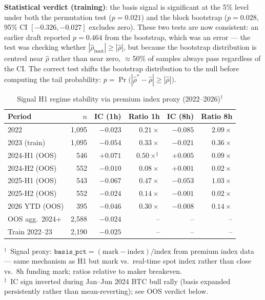 \documentclass[12pt, a4paper]{article}
\theoremstyle{definition}
\begin{document}
\textbf{Statistical verdict (training)}: the basis signal is significant at the 5\%
level under both the permutation test ($p = 0.021$) and the block bootstrap
($p = 0.028$, 95\% CI $[-0.326, -0.027]$ excludes zero). These two tests are
now consistent: an earlier draft reported $p = 0.464$ from the bootstrap, which
was an error — the test was checking whether $|\hat{\rho}_{\text{boot}}| \geq |\hat{\rho}|$,
but because the bootstrap distribution is centred near $\hat{\rho}$ rather than
near zero, $\approx$50\% of samples always pass regardless of the CI. The correct
test shifts the bootstrap distribution to the null before computing the tail
probability: $p = \Pr\bigl(|\hat{\rho}^* - \hat{\rho}| \geq |\hat{\rho}|\bigr)$.

\begin{table}[H]
\centering
\small
\caption{Signal H1 regime stability via premium index proxy (2022--2026)$^\dagger$}
\label{tab:h1_regime}
\begin{tabular}{lrrrrr}
\toprule
Period & $n$ & IC (1h) & Ratio 1h & IC (8h) & Ratio 8h \\
\midrule
2022             & 1,095 & $-0.023$ & $0.21\times$ & $-0.085$ & $2.09\times$ \\
2023 (train)     & 1,095 & $-0.054$ & $0.33\times$ & $-0.021$ & $0.36\times$ \\
\midrule
2024-H1 (OOS)    &   546 & $+0.071$ & $0.50\times^\ddagger$ & $+0.005$ & $0.09\times$ \\
2024-H2 (OOS)    &   552 & $-0.010$ & $0.08\times$ & $+0.001$ & $0.02\times$ \\
2025-H1 (OOS)    &   543 & $-0.067$ & $0.47\times$ & $-0.053$ & $\mathbf{1.03\times}$ \\
2025-H2 (OOS)    &   552 & $-0.024$ & $0.14\times$ & $-0.001$ & $0.02\times$ \\
2026 YTD (OOS)   &   395 & $-0.046$ & $0.30\times$ & $-0.008$ & $0.14\times$ \\
\midrule
OOS agg.\ 2024+  & 2,588 & $-0.024$ & -- & -- & -- \\
Train 2022--23   & 2,190 & $-0.025$ & -- & -- & -- \\
\bottomrule
\end{tabular}
\par\smallskip
\raggedright
\footnotesize
$^\dagger$~Signal proxy: $\mathtt{basis\_pct} = (\text{mark} - \text{index})/\text{index}$
from premium index data --- same mechanism as H1 but mark vs.\ real-time spot index
rather than close vs.\ 8h funding mark; ratios relative to maker breakeven.\\
$^\ddagger$~IC sign inverted during Jan--Jun 2024 BTC bull rally (basis expanded persistently
rather than mean-reverting); see OOS verdict below.
\end{table}
\end{document}
